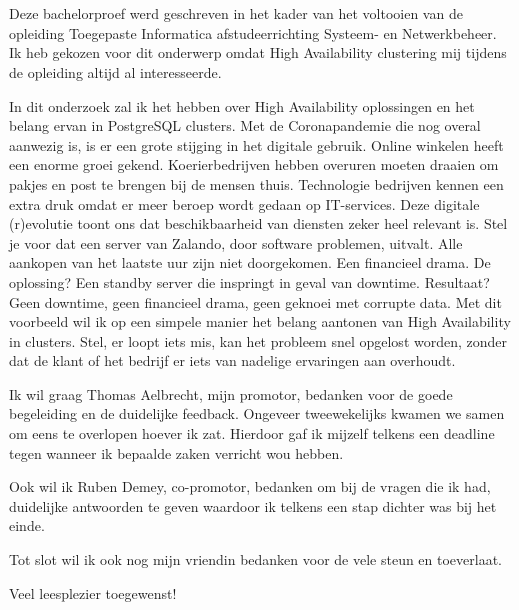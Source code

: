 
\chapter*{}
\label{ch:voorwoord}

Deze bachelorproef werd geschreven in het kader van het voltooien van de opleiding Toegepaste Informatica afstudeerrichting Systeem- en Netwerkbeheer. Ik heb gekozen voor dit onderwerp omdat High Availability clustering mij tijdens de opleiding altijd al interesseerde.

In dit onderzoek zal ik het hebben over High Availability oplossingen en het belang ervan in PostgreSQL clusters. Met de Coronapandemie die nog overal aanwezig is, is er een grote stijging in het digitale gebruik. Online winkelen heeft een enorme groei gekend. Koerierbedrijven hebben overuren moeten draaien om pakjes en post te brengen bij de mensen thuis. Technologie bedrijven kennen een extra druk omdat er meer beroep wordt gedaan op IT-services. Deze digitale (r)evolutie toont ons dat beschikbaarheid van diensten zeker heel relevant is. Stel je voor dat een server van Zalando, door software problemen, uitvalt. Alle aankopen van het laatste uur zijn niet doorgekomen. Een financieel drama. De oplossing? Een standby server die inspringt in geval van downtime. Resultaat? Geen downtime, geen financieel drama, geen geknoei met corrupte data. Met dit voorbeeld wil ik op een simpele manier het belang aantonen van High Availability in clusters. Stel, er loopt iets mis, kan het probleem snel opgelost worden, zonder dat de klant of het bedrijf er iets van nadelige ervaringen aan overhoudt.

Ik wil graag Thomas Aelbrecht, mijn promotor, bedanken voor de goede begeleiding en de duidelijke feedback. Ongeveer tweewekelijks kwamen we samen om eens te overlopen hoever ik zat. Hierdoor gaf ik mijzelf telkens een deadline tegen wanneer ik bepaalde zaken verricht wou hebben.

Ook wil ik Ruben Demey, co-promotor, bedanken om bij de vragen die ik had, duidelijke antwoorden te geven waardoor ik telkens een stap dichter was bij het einde.

Tot slot wil ik ook nog mijn vriendin bedanken voor de vele steun en toeverlaat.

Veel leesplezier toegewenst!